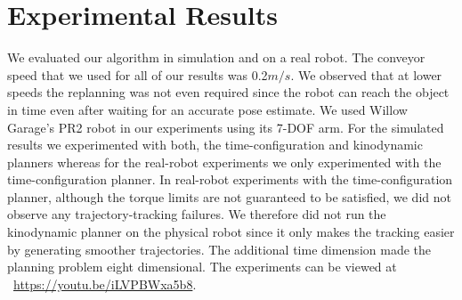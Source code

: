 \documentclass[a4paper]{report}
\begin{document}
\section{Experimental Results}
\label{sec:eval}
We evaluated our algorithm in simulation and on a real robot. The conveyor speed that we used for all of our results was 0.2$m/s$.
We observed that at lower speeds the replanning was not even required since the robot can reach the object in time even after waiting for an accurate pose estimate.
We used Willow Garage's PR2 robot in our experiments using its 7-DOF arm.
For the simulated results we experimented with both, the time-configuration and kinodynamic planners whereas for the real-robot experiments we only experimented with the time-configuration planner.
In real-robot experiments with the time-configuration planner, although the torque limits are not guaranteed to be satisfied, we did not observe any trajectory-tracking failures. We therefore did not run the kinodynamic planner on the physical robot since it only makes the tracking easier by generating smoother trajectories.
%
The additional time dimension made the planning problem eight dimensional.
The experiments can be viewed at
~\url{https://youtu.be/iLVPBWxa5b8}.
\end{document}
